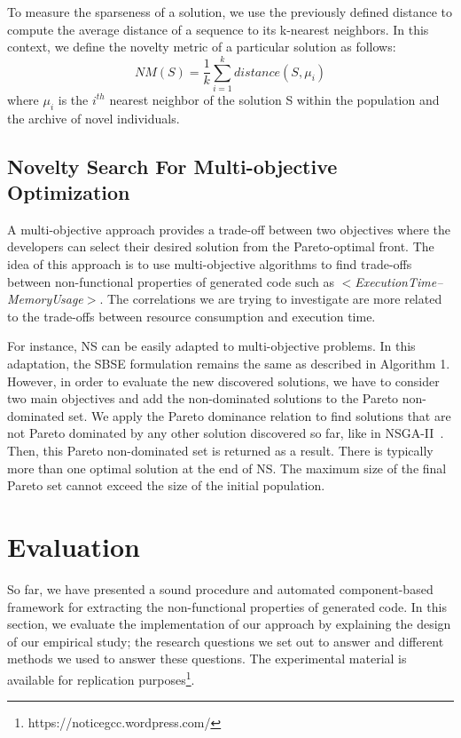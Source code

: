 To measure the sparseness of a solution, we use the previously defined distance to compute the average distance of a sequence to its k-nearest neighbors. In this context, we define the novelty metric of a particular solution as follows:
\begin{equation}
NM(S) = \frac{1}{k} \sum_{i=1}^{k} distance(S,\mu _{i})
\end{equation}
where $\mu _{i}$ is the $i^{th}$ nearest neighbor of the solution S within the population and the archive of novel individuals. 

\subsection{Novelty Search For Multi-objective Optimization}
A multi-objective approach provides a trade-off between two objectives where the developers can select their desired solution from the Pareto-optimal front. The idea of this approach is to use multi-objective algorithms to find trade-offs between non-functional properties of generated code such as \textit{$<$ExecutionTime--MemoryUsage$>$}. The correlations we are trying to investigate are more related to the trade-offs between resource consumption and execution time.

For instance, NS can be easily adapted to multi-objective problems. In this adaptation, the SBSE formulation remains the same as described in Algorithm 1. However, in order to evaluate the new discovered solutions, we have to consider two main objectives and add the non-dominated solutions to the Pareto non-dominated set. We apply the Pareto dominance relation to find solutions that are not Pareto dominated by any other solution discovered so far, like in NSGA-II~\cite{lokuciejewski2010multi, deb2002fast}. Then, this Pareto non-dominated set is returned as a result.
There is typically more than one optimal solution at the end of NS. The maximum size of the final Pareto set cannot exceed the size of the initial population.


\section{Evaluation}
So far, we have presented a sound procedure and automated component-based framework for extracting the non-functional properties of generated code. In this section, we evaluate the implementation of our approach by explaining the design of our empirical study; the research questions we set out to answer and different methods we used to answer these questions. The experimental material is available for replication purposes\footnote{https://noticegcc.wordpress.com/}.

